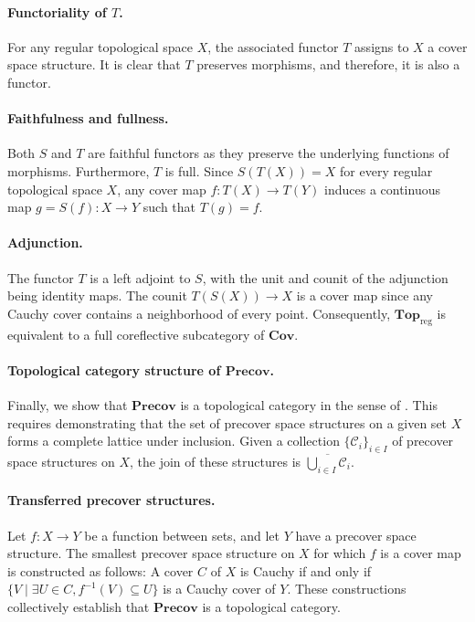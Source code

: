\documentclass[pdflatex,sn-mathphys-num]{sn-jnl}
\theoremstyle{definition}
\theoremstyle{remark}
\numberwithin{figure}{section}
\newcommand{\cat}[1]{\mathbf{#1}}
\begin{document}
\paragraph{Functoriality of $T$.}
For any regular topological space $X$, the associated functor $T$ assigns to $X$ a cover space structure.
It is clear that $T$ preserves morphisms, and therefore, it is also a functor.

\paragraph{Faithfulness and fullness.}
Both $S$ and $T$ are faithful functors as they preserve the underlying functions of morphisms.
Furthermore, $T$ is full.
Since $S(T(X)) = X$ for every regular topological space $X$, any cover map $f : T(X) \to T(Y)$ induces a continuous map $g = S(f) : X \to Y$ such that $T(g) = f$.

\paragraph{Adjunction.}
The functor $T$ is a left adjoint to $S$, with the unit and counit of the adjunction being identity maps.
The counit $T(S(X)) \to X$ is a cover map since any Cauchy cover contains a neighborhood of every point.
Consequently, $\cat{Top}_\mathrm{reg}$ is equivalent to a full coreflective subcategory of $\cat{Cov}$.

\paragraph{Topological category structure of $\cat{Precov}$.}
Finally, we show that $\cat{Precov}$ is a topological category in the sense of \cite[Definition~21.7]{joy-cats}.
This requires demonstrating that the set of precover space structures on a given set $X$ forms a complete lattice under inclusion.
Given a collection $\{\mathcal{C}_i\}_{i \in I}$ of precover space structures on $X$,
the join of these structures is $\overline{\bigcup_{i \in I} \mathcal{C}_i}$.

\paragraph{Transferred precover structures.}
Let $f : X \to Y$ be a function between sets, and let $Y$ have a precover space structure.
The smallest precover space structure on $X$ for which $f$ is a cover map is constructed as follows:
A cover $C$ of $X$ is Cauchy if and only if $\{ V \mid \exists U \in C, f^{-1}(V) \subseteq U \}$ is a Cauchy cover of $Y$.
These constructions collectively establish that $\cat{Precov}$ is a topological category.
\end{document}
